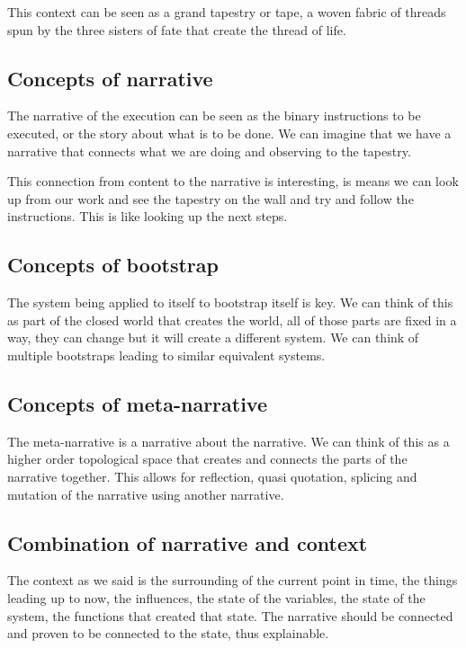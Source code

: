 \documentclass{article}
\begin{document}
This context can be seen as a grand tapestry or tape, a woven fabric of threads
spun by the three sisters of fate that create the thread of life.

\subsection{Concepts of narrative}

The narrative of the execution can be seen as the binary instructions to be executed, or the story about what is to be done. We can imagine that
we have a narrative that connects what we are doing and observing
to the tapestry. 

This connection from content to the narrative is interesting,
is means we can look up from our work and see the tapestry on the wall and try and follow the instructions. This is like looking up the next steps.

\subsection{Concepts of bootstrap}

The system being applied to itself to bootstrap itself is key.
We can think of this as part of the closed world that creates the world,
all of those parts are fixed in a way, they can change but it will create a different system. We can think of multiple bootstraps leading to similar equivalent systems.

\subsection{Concepts of meta-narrative}

The meta-narrative is a narrative about the narrative. We can think of this as a higher order topological space that creates and connects the parts of the narrative together. This allows for reflection, quasi quotation, splicing and mutation of the narrative using another narrative. 

\subsection{Combination of narrative and context}

The context as we said is the surrounding of the current point in time,
the things leading up to now, the influences, the state of the  variables,
the state of the system, the functions that created that state. The narrative should be connected and proven to be connected to the state, thus explainable.
\end{document}
